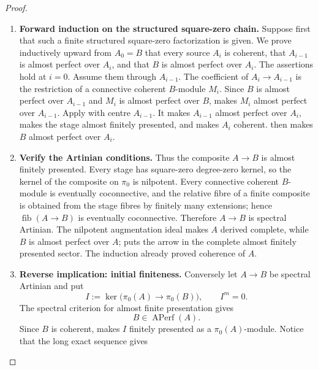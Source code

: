\begin{proof}
\leavevmode
\begin{enumerate}[label=\textup{(\arabic*)}]
    \item \textbf{Forward induction on the structured square-zero chain.}
    Suppose first that such a finite structured square-zero factorization is given. We prove
    inductively upward from \(A_0=B\) that every source \(A_i\) is coherent, that
    \(A_{i-1}\) is almost perfect over \(A_i\), and that \(B\) is almost perfect
    over \(A_i\). The assertions hold at \(i=0\). Assume them through
    \(A_{i-1}\). The coefficient of \(A_i\to A_{i-1}\) is the restriction of a
    connective coherent \(B\)-module \(M_i\). Since \(B\) is almost perfect over
    \(A_{i-1}\) and \(M_i\) is almost perfect over \(B\),
     makes \(M_i\) almost
    perfect over \(A_{i-1}\). Apply
     with centre \(A_{i-1}\). It makes
    \(A_{i-1}\) almost perfect over \(A_i\), makes the stage almost finitely
    presented, and makes \(A_i\) coherent.  then makes \(B\) almost
    perfect over \(A_i\).
    \item \textbf{Verify the Artinian conditions.}
    Thus the composite \(A\to B\) is almost finitely presented. Every stage has
    square-zero degree-zero kernel, so the kernel of the composite on \(\pi_0\) is
    nilpotent. Every connective coherent \(B\)-module is eventually coconnective, and the
    relative fibre of a finite composite is obtained from the stage fibres by
    finitely many extensions; hence \(\operatorname{fib}(A\to B)\) is eventually
    coconnective. Therefore \(A\to B\) is spectral Artinian. The nilpotent
    augmentation ideal makes \(A\) derived complete, while \(B\) is almost perfect
    over \(A\);  puts the arrow
    in the complete almost finitely presented sector. The induction already proved coherence
    of \(A\).
    \item \textbf{Reverse implication: initial finiteness.}
    Conversely let \(A\to B\) be spectral Artinian and put
    \[
        I:=\ker\bigl(\pi_0(A)\to\pi_0(B)\bigr),
        \qquad
        I^m=0.
    \]
    The spectral criterion for almost finite presentation gives
    \[
        B\in\operatorname{APerf}(A).
    \]
    Since \(B\) is coherent,
     makes \(I\) finitely
    presented as a \(\pi_0(A)\)-module. Notice that the long exact sequence gives

\end{enumerate}
\end{proof}
